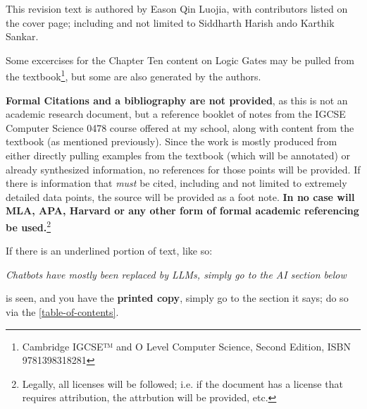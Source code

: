 \documentclass[../main.tex]{subfiles}
\begin{document}
\enumerate

\item This revision text is authored by Eason Qin Luojia, with contributors listed on the cover page; including and not limited to Siddharth Harish ando Karthik Sankar.

\item Some excercises for the Chapter Ten content on Logic Gates may be pulled from the textbook\footnote{Cambridge IGCSE™ and O Level Computer Science, Second Edition, ISBN 9781398318281}, but some are also generated by the authors.

\item \textbf{Formal Citations and a bibliography are not provided}, as this is not an academic research document, but a reference booklet of notes from the IGCSE Computer Science 0478 course offered at my school, along with content from the textbook (as mentioned previously). Since the work is mostly produced from either directly pulling examples from the textbook (which will be annotated) or already synthesized information, no references for those points will be provided. If there is information that \textit{must} be cited, including and not limited to extremely detailed data points, the source will be provided as a foot note. \textbf{In no case will MLA, APA, Harvard or any other form of formal academic referencing be used.}\footnote{Legally, all licenses will be followed; i.e. if the document has a license that requires attribution, the attrbution will be provided, etc.}

\item If there is an underlined portion of text, like so:

      \textit{Chatbots have mostly been replaced by LLMs, simply go to the AI section below}

      is seen, and you have the \textbf{printed copy}, simply go to the section it says; do so via the \ref{table-of-contents}.


\endenumerate
\end{document}
